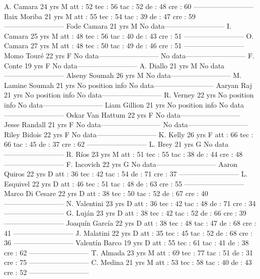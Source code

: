A. Camara  24 yrs 
M 
 att : 52 
 tec : 56 
 tac : 52 
 de : 48 
 cre : 60 
--------------------------
Ilaix Moriba  21 yrs 
M 
 att : 55 
 tec : 54 
 tac : 39 
 de : 47 
 cre : 59 
--------------------------
Fode Camara  21 yrs 
M 
No data--------------------------
I. Camara  25 yrs 
M 
 att : 48 
 tec : 56 
 tac : 40 
 de : 43 
 cre : 51 
--------------------------
O. Camara  27 yrs 
M 
 att : 48 
 tec : 50 
 tac : 49 
 de : 46 
 cre : 51 
--------------------------
Momo Touré  22 yrs 
F 
No data--------------------------
No data--------------------------
F. Conte  19 yrs 
F 
No data--------------------------
A. Diallo  21 yrs 
M 
No data--------------------------
Alseny Soumah  26 yrs 
M 
No data--------------------------
M. Lamine Soumah  21 yrs 
No position info 
No data--------------------------
Aaryan Raj  21 yrs 
No position info 
No data--------------------------
R. Verney  22 yrs 
No position info 
No data--------------------------
Liam Gillion  21 yrs 
No position info 
No data--------------------------
Oskar Van Hattum  22 yrs 
F 
No data--------------------------
Jesse Randall  21 yrs 
F 
No data--------------------------
No data--------------------------
Riley Bidois  22 yrs 
F 
No data--------------------------
K. Kelly  26 yrs 
F 
 att : 66 
 tec : 66 
 tac : 45 
 de : 37 
 cre : 62 
--------------------------
L. Brey  21 yrs 
G 
No data--------------------------
R. Ríos  23 yrs 
M 
 att : 51 
 tec : 55 
 tac : 38 
 de : 44 
 cre : 48 
--------------------------
F. Iacovich  22 yrs 
G 
No data--------------------------
Aaron Quiros  22 yrs 
D 
 att : 36 
 tec : 42 
 tac : 54 
 de : 71 
 cre : 37 
--------------------------
L. Esquivel  22 yrs 
D 
 att : 46 
 tec : 51 
 tac : 48 
 de : 63 
 cre : 55 
--------------------------
Marco Di Cesare  22 yrs 
D 
 att : 38 
 tec : 50 
 tac : 52 
 de : 67 
 cre : 40 
--------------------------
N. Valentini  23 yrs 
D 
 att : 36 
 tec : 42 
 tac : 48 
 de : 71 
 cre : 34 
--------------------------
G. Luján  23 yrs 
D 
 att : 38 
 tec : 42 
 tac : 52 
 de : 66 
 cre : 39 
--------------------------
Joaquín García  22 yrs 
D 
 att : 38 
 tec : 48 
 tac : 47 
 de : 68 
 cre : 41 
--------------------------
J. Malatini  22 yrs 
D 
 att : 35 
 tec : 45 
 tac : 52 
 de : 68 
 cre : 36 
--------------------------
Valentín Barco  19 yrs 
D 
 att : 55 
 tec : 61 
 tac : 41 
 de : 38 
 cre : 62 
--------------------------
T. Almada  23 yrs 
M 
 att : 69 
 tec : 77 
 tac : 51 
 de : 31 
 cre : 75 
--------------------------
C. Medina  21 yrs 
M 
 att : 53 
 tec : 58 
 tac : 40 
 de : 43 
 cre : 52 
--------------------------
